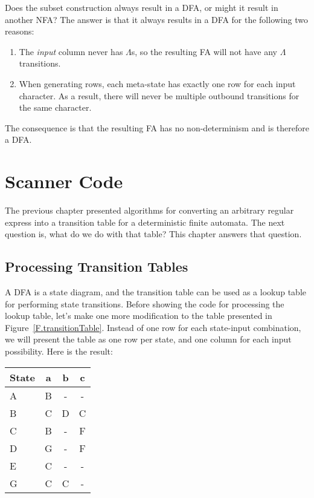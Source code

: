 \documentclass[letterpaper,12pt,openany,reqno]{book}%
\begin{document}
Does the subset construction always result in a DFA, or might it result in another NFA? The answer is that it always results in a DFA for the following two reasons:
\begin{enumerate}
\item The \emph{input} column never has $\Lambda$s, so the resulting FA will not have any $\Lambda$ transitions.
\item When generating rows, each meta-state has exactly one row for each input character. As a result, there will never be multiple outbound transitions for the same character.
\end{enumerate}
The consequence is that the resulting FA has no non-determinism and is therefore a DFA.

\chapter{Scanner Code}
The previous chapter presented algorithms for converting an arbitrary regular express into a transition table for a deterministic finite automata. The next question is, what do we do with that table? This chapter answers that question.

\section{Processing Transition Tables}\label{S.ScannerCode}
A DFA is a state diagram, and the transition table can be used as a lookup table for performing state transitions. Before showing the code for processing the lookup table, let's make one more modification to the table presented in Figure~\ref{F.transitionTable}. Instead of one row for each state-input combination, we will present the table as one row per state, and one column for each input possibility. Here is the result:

\begin{center}
\small
\begin{tabular}{l|c|c|c}
\hline
\textbf{State} & \textbf{a} & \textbf{b} & \textbf{c} \\
\hline
A & B & - & - \\
B & C & D & C \\
C & B & - & F \\
D & G & - & F \\
E & C & - & - \\
G & C & C & - \\
\hline
\end{tabular}
\end{center}
\end{document}
